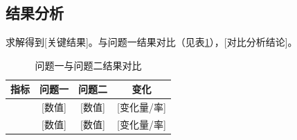 \subsection{结果分析}

求解得到[关键结果]。与问题一结果对比（见表\ref{tab:comparison}），[对比分析结论]。

\begin{table}[H]
    \centering
    \caption{问题一与问题二结果对比}
    \label{tab:comparison}
    \begin{tabular}{cccc}
        \toprule
        \textbf{指标} & \textbf{问题一} & \textbf{问题二} & \textbf{变化} \\
        \midrule
        [指标1] & [数值] & [数值] & [变化量/率] \\
        [指标2] & [数值] & [数值] & [变化量/率] \\
        \bottomrule
    \end{tabular}
\end{table}
